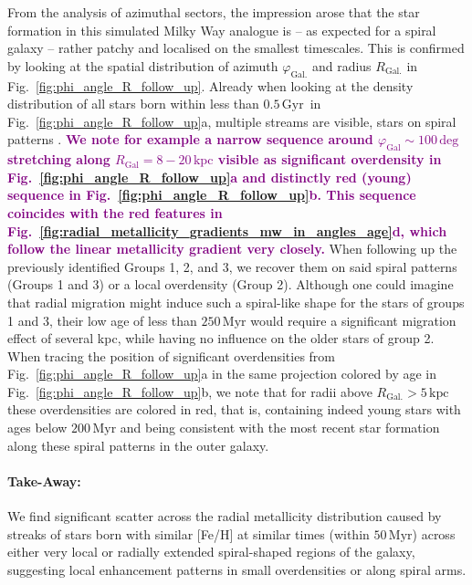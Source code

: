 \documentclass[twocolumn,apj,numberedappendix,appendixfloats,twocolappendix]{openjournal}
\newcommand{\adjusted}[1]{\textbf{\textcolor{purple}{#1}}}
\newcommand{\nihaoAGEmax}{$0.5\,\mathrm{Gyr}$}
\begin{document}
\begin{CJK*}{UTF8}{gbsn}
From the analysis of azimuthal sectors, the impression arose that the star formation in this simulated Milky Way analogue is -- as expected for a spiral galaxy -- rather patchy and localised on the smallest timescales. This is confirmed by looking at the spatial distribution of azimuth $\varphi_\mathrm{Gal.}$ and radius $R_\mathrm{Gal.}$ in Fig.~\ref{fig:phi_angle_R_follow_up}. Already when looking at the density distribution of all stars born within less than \nihaoAGEmax\ in Fig.~\ref{fig:phi_angle_R_follow_up}a, multiple streams are visible, stars on spiral patterns \citep[see also][]{Kreckel2019, Chen2024b}. \adjusted{We note for example a narrow sequence around $\varphi_\mathrm{Gal} \sim 100\,\mathrm{deg}$ stretching along $R_\mathrm{Gal} = 8-20\,\mathrm{kpc}$ visible as significant overdensity in Fig.~\ref{fig:phi_angle_R_follow_up}a and distinctly red (young) sequence in Fig.~\ref{fig:phi_angle_R_follow_up}b. This sequence coincides with the red features in Fig.~\ref{fig:radial_metallicity_gradients_mw_in_angles_age}d, which follow the linear metallicity gradient very closely.} When following up the previously identified Groups 1, 2, and 3, we recover them on said spiral patterns (Groups 1 and 3) or a local overdensity (Group 2). Although one could imagine that radial migration might induce such a spiral-like shape for the stars of groups 1 and 3, their low age of less than $250\,\mathrm{Myr}$ would require a significant migration effect of several kpc, while having no influence on the older stars of group 2. When tracing the position of significant overdensities from Fig.~\ref{fig:phi_angle_R_follow_up}a in the same projection colored by age in Fig.~\ref{fig:phi_angle_R_follow_up}b, we note that for radii above $R_\mathrm{Gal.} > 5\,\mathrm{kpc}$ these overdensities are colored in red, that is, containing indeed young stars with ages below $200\,\mathrm{Myr}$ and being consistent with the most recent star formation along these spiral patterns in the outer galaxy.

\paragraph*{Take-Away:} We find significant scatter across the radial metallicity distribution caused by streaks of stars born with similar [Fe/H] at similar times (within $50\,\mathrm{Myr}$) across either very local or radially extended spiral-shaped regions of the galaxy, suggesting local enhancement patterns in small overdensities or along spiral arms.


\end{CJK*}
\end{document}

